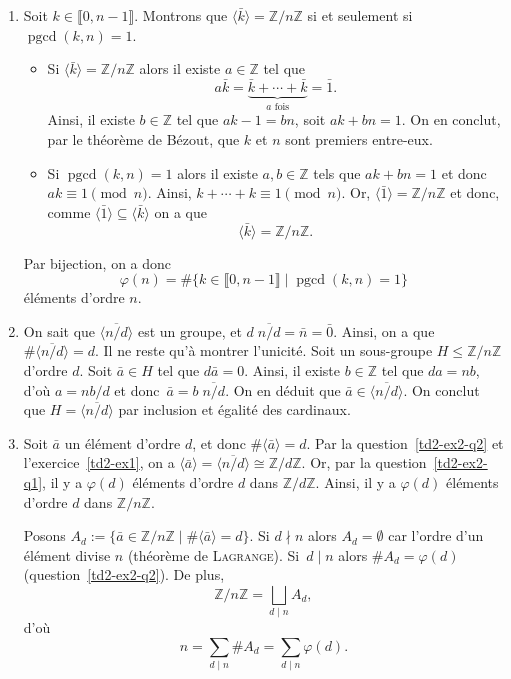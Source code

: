 \documentclass[./main]{subfiles}
\begin{document}
  \begin{enumerate}
    \item Soit $k \in \llbracket 0, n - 1 \rrbracket$.
      Montrons que $\langle \bar{k} \rangle = \mathds{Z} / n \mathds{Z}$ si et seulement si $\operatorname{pgcd}(k,n) = 1$.
       \begin{itemize}
         \item Si $\langle \bar{k} \rangle = \mathds{Z} / n\mathds{Z}$ alors il existe $a \in \mathds{Z}$ tel que \[
             a \bar{k} = \underbrace{\bar{k} + \cdots + \bar{k}}_{a \text{ fois}} = \bar{1}
            .\]
            Ainsi, il existe $b \in \mathds{Z}$ tel que $a k - 1 = b n$, soit $a k + b n = 1$.
            On en conclut, par le théorème de Bézout, que  $k$ et $n$ sont premiers entre-eux.
          \item Si $\operatorname{pgcd}(k,n) = 1$ alors il existe  $a,b \in \mathds{Z}$ tels que $a k + b n = 1$ et donc  $a k \equiv 1 \pmod n$.
            Ainsi,  $k + \cdots + k \equiv 1 \pmod n$.
            Or, $\langle \bar{1} \rangle = \mathds{Z} / n \mathds{Z}$ et donc, comme $\langle \bar{1} \rangle \subseteq \langle \bar{k} \rangle$ on a que \[
              \langle \bar{k} \rangle = \mathds{Z} / n \mathds{Z}
            .\] 
      \end{itemize}
      Par bijection, on a donc \[
        \varphi(n) = \#\{k \in \llbracket 0, n - 1 \rrbracket  \mid \operatorname{pgcd}(k,n) = 1\}
      \] éléments d'ordre $n$.
    \item On sait que $\langle \overline{n / d} \rangle$ est un groupe, et $d\;\overline{n / d} = \bar{n} = \bar{0}$.
      Ainsi, on a que $\# \langle \overline{n / d} \rangle = d$.
      Il ne reste qu'à montrer l'unicité.
      Soit un sous-groupe $H \le  \mathds{Z}/n\mathds{Z}$ d'ordre $d$.
      Soit $\bar{a} \in H$ tel que $d \bar{a} = 0$.
      Ainsi, il existe $b \in \mathds{Z}$ tel que $d a = nb$, d'où $a = n b / d$ et donc~$\bar{a} = b \; \overline{n / d}$.
      On en déduit que $\bar{a} \in \langle \overline{n / d} \rangle$.
      On conclut que $H = \langle \overline{ n /d }\rangle$ par inclusion et égalité des cardinaux.
    \item Soit $\bar{a}$ un élément d'ordre $d$, et donc $\# \langle \bar{a} \rangle = d$.
      Par la question~\ref{td2-ex2-q2} et l'exercice~\ref{td2-ex1}, on a $\langle \bar{a} \rangle = \langle \overline{n / d}\rangle \cong \mathds{Z} / d \mathds{Z}$.
      Or, par la question~\ref{td2-ex2-q1}, il y a $\varphi(d)$ éléments d'ordre $d$ dans $\mathds{Z} / d \mathds{Z}$.
      Ainsi, il y a $\varphi(d)$ éléments d'ordre $d$ dans $\mathds{Z} / n \mathds{Z}$.

      Posons $A_d := \{\bar{a} \in \mathds{Z}/ n \mathds{Z}  \mid \#\langle \bar{a} \rangle = d \}$.
      Si $d  \nmid n$ alors $A_d = \emptyset$ car l'ordre d'un élément divise $n$ (théorème de \textsc{Lagrange}).
      Si~$d  \mid n$ alors $\# A_d = \varphi(d)$ (question~\ref{td2-ex2-q2}). De plus, \[
      \mathds{Z} / n \mathds{Z} = \bigsqcup_{d  \mid  n} A_d
      ,\] d'où \[
      n = \sum_{d  \mid n} \# A_d = \sum_{d  \mid n} \varphi(d)
      .\] 
  \end{enumerate}
\end{document}
